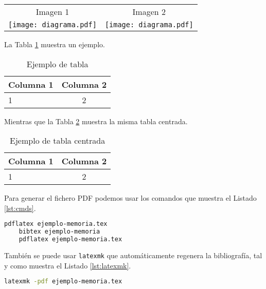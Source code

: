   \begin{tabular}{cc}
    Imagen 1 & Imagen 2 \\[2mm]
    \texttt{[image: diagrama.pdf]} &  \texttt{[image: diagrama.pdf]}
  \end{tabular}

  La Tabla \ref{tbl:ejemplo} muestra un ejemplo.

\begin{table}[h!tb]
  \caption{Ejemplo de tabla \label{tbl:ejemplo}}
  \begin{tabular}{|l|c|}
    \hline
    Columna 1 & Columna 2 \\ \hline
    1 & 2 \\ \hline
  \end{tabular}
\end{table}


  \vspace*{1cm}
  Mientras que la Tabla \ref{tbl:centrada} muestra la misma tabla centrada. 

  \begin{table}[h!tb]
  \caption{Ejemplo de tabla centrada \label{tbl:centrada}}
  \begin{center}
    \begin{tabular}{|l|c|}
      \hline
      Columna 1 & Columna 2 \\ \hline
      1 & 2 \\ \hline
    \end{tabular}
  \end{center}
  
\end{table}

  Para generar el fichero PDF podemos usar los comandos que muestra el Listado \ref{lst:cmds}.

  \begin{lstlisting}[language=bash,caption={Comandos para generar PDF con pdflatex},label={lst:cmds}]
    pdflatex ejemplo-memoria.tex
    bibtex ejemplo-memoria
    pdflatex ejemplo-memoria.tex
\end{lstlisting}

  También se puede usar \texttt{latexmk} que automáticamente regenera la bibliografía, tal y como muestra el Listado \ref{lst:latexmk}.

  \begin{lstlisting}[language=bash,caption={Comandos para generar PDF con latexmk},label={lst:latexmk}]
    latexmk -pdf ejemplo-memoria.tex
\end{lstlisting}
